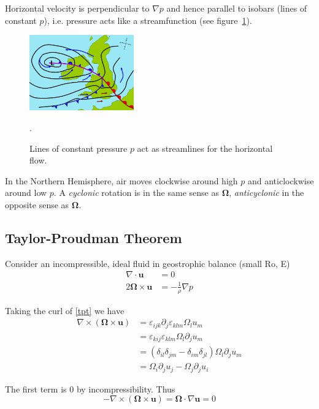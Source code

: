 \documentclass{jknotes}
\newcommand{\Ro}{Ro}
\newcommand{\Ek}{E}
\newcommand{\vare}{\varepsilon}
\begin{document}
Horizontal velocity is perpendicular to $\nabla p$ and hence parallel to
isobars (lines of constant $p$), i.e. pressure acts like a streamfunction (see
figure~\ref{fig:isobars}).

\begin{figure}
	\centering
	\includegraphics[width=0.4\textwidth]{isobars.png}
	\caption{Lines of constant pressure $p$ act as streamlines for the
	horizontal flow.}
	\label{fig:isobars}.
\end{figure}

In the Northern Hemisphere, air moves clockwise around high $p$ and
anticlockwise around low $p$. A \emph{cyclonic} rotation is in the same sense
as $\bm{\Omega}$, \emph{anticyclonic} in the opposite sense as $\bm{\Omega}$.

\subsection{Taylor-Proudman Theorem}
Consider an incompressible, ideal fluid in geostrophic balance (small \Ro,
\Ek)
\begin{align}
	\nabla \cdot \bm{u} &= 0\\
	2 \bm{\Omega} \times \bm{u} &= -\frac{1}{\rho}\nabla p \label{tpt}
\end{align}

Taking the curl of \eqref{tpt} we have
\begin{equation}
	\begin{aligned}
		\nabla \times \left( \bm{\Omega} \times \bm{u}\right) &= \vare_{ijk}
		\partial_j \vare_{klm} \Omega_l u_m \\
		&= \vare_{kij} \vare_{klm} \Omega_l \partial_j u_m \\
		&= \left(\delta_{il} \delta_{jm} - \delta_{im} \delta_{jl}\right)
		\Omega_l \partial_j u_m \\
		&= \Omega_i \partial_j u_j - \Omega_j \partial_j u_i
	\end{aligned}
\end{equation}

The first term is $0$ by incompressibility. Thus
\begin{equation}
	-\nabla \times \left(\bm{\Omega} \times \bm{u}\right) = \bm{\Omega} \cdot
	\nabla \bm{u} = 0
\end{equation}
\end{document}
